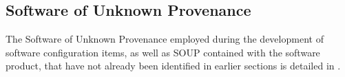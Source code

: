 \subsection{Software of Unknown Provenance}
The Software of Unknown Provenance employed during the development of software
configuration items, as well as SOUP contained with the software product, that
have not already been identified in earlier sections is detailed in
\soupdesignnum \textit{\soupdesigntitle}. 
